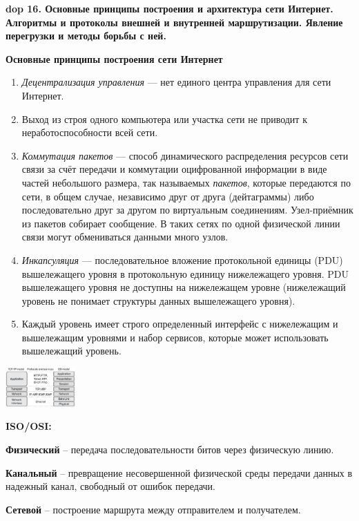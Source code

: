 \textbf{\LARGE dop 16. Основные  принципы  построения  и  архитектура  сети  Интернет.  Алгоритмы  и  протоколы  внешней  и внутренней маршрутизации. Явление перегрузки и методы борьбы с ней.}

\textbf{Основные принципы построения сети Интернет}

\begin{enumerate}
    \item \textit{Децентрализация управления} --- нет единого центра управления для сети Интернет.
    \item Выход из строя одного компьютера или участка сети не приводит к неработоспособности всей сети.
    \item \textit{Коммутация пакетов} --- способ динамического распределения ресурсов сети связи за счёт передачи и коммутации оцифрованной информации в виде частей небольшого размера, так называемых \textit{пакетов}, которые передаются по сети, в общем случае, независимо друг от друга (дейтаграммы) либо последовательно друг за другом по виртуальным соединениям. 
    Узел-приёмник из пакетов собирает сообщение. 
    В таких сетях по одной физической линии связи могут обмениваться данными много узлов.
    \item \textit{Инкапсуляция} --- последовательное вложение протокольной единицы (PDU) вышележащего уровня в протокольную единицу нижележащего уровня. 
    PDU вышележащего уровня не доступны на нижележащем уровне (нижележащий уровень не понимает структуры данных вышележащего уровня).
    \item Каждый уровень имеет строго определенный интерфейс с нижележащим и вышележащим уровнями и набор сервисов, которые может использовать вышележащий уровень.
\end{enumerate}

\bigbreak
\includegraphics[width=0.2\textwidth]{pics/protocols.png}

\textbf{ISO/OSI:}

\textbf{Физический} -- передача последовательности битов через физическую линию.

\textbf{Канальный} -- превращение несовершенной физической среды передачи данных в надежный канал, свободный от ошибок передачи.

\textbf{Сетевой} -- построение маршрута между отправителем и получателем.

